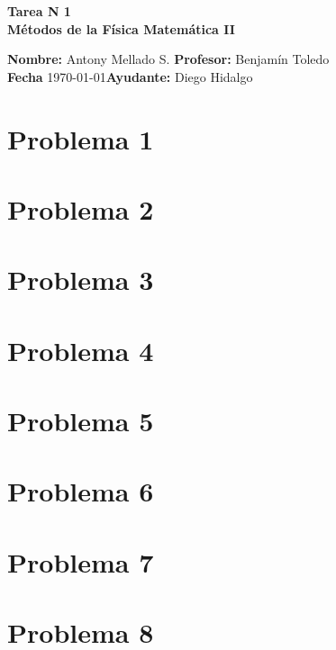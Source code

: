 \documentclass[a4paper, 11pt]{article}
\begin{document}
\begin{center}
\LARGE \bf Tarea N 1\\ M\'etodos de la F\'isica Matem\'atica II
\end{center}

\vspace{1cm} 
\noindent\textbf{Nombre:} Antony Mellado S. \hfill \textbf{Profesor:} Benjam\'in Toledo  
\hfill \\
\textbf{Fecha} \today \hfill \textbf{Ayudante:} Diego Hidalgo  \\ 
\vspace{3cm} 


\section*{Problema 1}
\section*{Problema 2}
\section*{Problema 3}
\section*{Problema 4}
\section*{Problema 5}
\section*{Problema 6}
\section*{Problema 7}
\section*{Problema 8}
\end{document}
